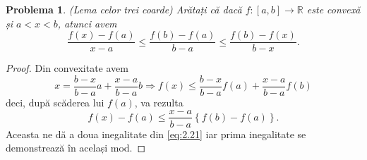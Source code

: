 \documentclass[a4paper,12pt,oneside]{report}
\newtheorem{problem}{Problema}
\begin{document}
\begin{problem} (Lema celor trei coarde)
Arătați că dacă \(f : \left [ a,b \right ]  \to \mathbb{R}\) este convexă și \(a <  x < b\), atunci avem
\begin{displaymath}
    \frac{f\left ( x \right ) - f\left ( a \right )}{x - a} \leq \frac{f\left ( b \right ) - f\left ( a \right )}{b - a} \leq  \frac{f\left ( b \right ) - f\left ( x \right )}{b - x}.   \label{eq:2.21}\tag{2.21}
\end{displaymath}
\end{problem}
\begin{proof}
Din convexitate avem
\begin{displaymath}
    x = \frac{b - x}{b - a}a + \frac{x - a}{b - a }b \Rightarrow f\left ( x \right ) \leq \frac{b - x}{b - a}f\left ( a \right ) + \frac{x - a}{b - a }f\left ( b \right )
\end{displaymath}
 deci, după scăderea lui \(f\left ( a \right )\), va rezulta
 \begin{displaymath}
     f\left ( x \right ) - f\left ( a \right )\leq \frac{x - a}{b - a }\left \{ f\left ( b \right ) - f\left ( a \right ) \right \}. \label{eq:2.22} \tag{2.22}
 \end{displaymath}
Aceasta ne dă a doua inegalitate din \ref{eq:2.21} iar prima inegalitate se demonstrează în același mod.
\end{proof}









\setlength{\baselineskip}{\normalbaselineskip}
\setlength{\parskip}{0pt}

\end{document}

